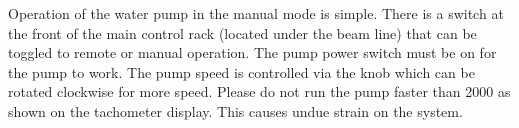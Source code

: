 Operation of the water pump in the manual mode is simple. There is
a switch at the front of the main control rack (located under the
beam line) that can be toggled to remote or manual operation. The
pump power switch must be on for the pump to work. The pump speed
is controlled via the knob which can be rotated clockwise for more
speed. Please do not run the pump faster than 2000 as shown on the
tachometer display. This causes undue strain on the system.
%
%
%
%
%

